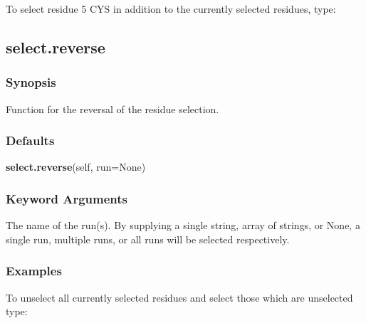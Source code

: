

To select residue 5 CYS in addition to the currently selected residues, type:









\newpage

\subsection{select.reverse}


\subsubsection{Synopsis}

Function for the reversal of the residue selection.



\subsubsection{Defaults}

\textsf{\textbf{select.reverse}(self, run=None)}


\subsubsection{Keyword Arguments}

  The name of the run(s).  By supplying a single string, array of strings, or None, a single run, multiple runs, or all runs will be selected respectively. 




\subsubsection{Examples}

To unselect all currently selected residues and select those which are unselected type:


